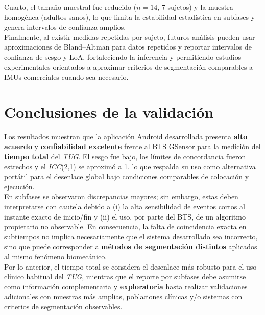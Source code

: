 \documentclass[12pt]{report}
\begin{document}
\begin{justify}
    Cuarto, el tamaño muestral fue reducido ($n=14$, 7 sujetos) y la muestra homogénea (adultos sanos), lo que limita la estabilidad estadística en subfases y genera intervalos de confianza amplios.\\

    Finalmente, al existir medidas repetidas por sujeto, futuros análisis pueden usar aproximaciones de Bland--Altman para datos repetidos y reportar intervalos de confianza de sesgo y LoA, fortaleciendo la inferencia y permitiendo estudios experimentales orientados a aproximar criterios de segmentación comparables a IMUs comerciales cuando sea necesario.\\



    \section{Conclusiones de la validación}
    \label{sec:conclusiones-validacion}

    Los resultados muestran que la aplicación Android desarrollada presenta \textbf{alto acuerdo} y \textbf{confiabilidad excelente} frente al BTS GSensor para la medición del \textbf{tiempo total} del \textit{TUG}. El sesgo fue bajo, los límites de concordancia fueron estrechos y el \textit{ICC}(2,1) se aproximó a 1, lo que respalda su uso como alternativa portátil para el desenlace global bajo condiciones comparables de colocación y ejecución.\\

    En subfases se observaron discrepancias mayores; sin embargo, estas deben interpretarse con cautela debido a (i) la alta sensibilidad de eventos cortos al instante exacto de inicio/fin y (ii) el uso, por parte del BTS, de un algoritmo propietario no observable. En consecuencia, la falta de coincidencia exacta en subtiempos no implica necesariamente que el sistema desarrollado sea incorrecto, sino que puede corresponder a \textbf{métodos de segmentación distintos} aplicados al mismo fenómeno biomecánico.\\

    Por lo anterior, el tiempo total se considera el desenlace más robusto para el uso clínico habitual del \textit{TUG}, mientras que el reporte por subfases debe asumirse como información complementaria y \textbf{exploratoria} hasta realizar validaciones adicionales con muestras más amplias, poblaciones clínicas y/o sistemas con criterios de segmentación observables.




\end{justify}
\end{document}
